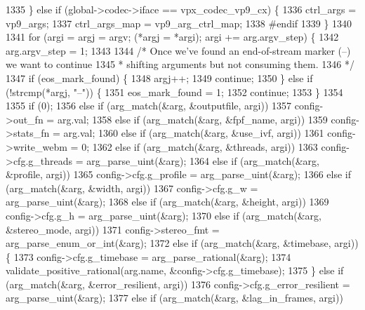 \begin{DoxyCodeInclude}
{{{{{{{{{{{{{{{{{{{{{{{{{{{{{{{{{{1335   \} \textcolor{keywordflow}{else} \textcolor{keywordflow}{if} (global->codec->iface == vpx\_codec\_vp9\_cx) \{
1336     ctrl\_args = vp9\_args;
1337     ctrl\_args\_map = vp9\_arg\_ctrl\_map;
1338 \textcolor{preprocessor}{#endif}
1339   \}
1340 
1341   \textcolor{keywordflow}{for} (argi = argj = argv; (*argj = *argi); argi += arg.argv\_step) \{
1342     arg.argv\_step = 1;
1343 
1344     \textcolor{comment}{/* Once we've found an end-of-stream marker (--) we want to continue}
1345 \textcolor{comment}{     * shifting arguments but not consuming them.}
1346 \textcolor{comment}{     */}
1347     \textcolor{keywordflow}{if} (eos\_mark\_found) \{
1348       argj++;
1349       \textcolor{keywordflow}{continue};
1350     \} \textcolor{keywordflow}{else} \textcolor{keywordflow}{if} (!strcmp(*argj, \textcolor{stringliteral}{"--"})) \{
1351       eos\_mark\_found = 1;
1352       \textcolor{keywordflow}{continue};
1353     \}
1354 
1355     \textcolor{keywordflow}{if} (0);
1356     \textcolor{keywordflow}{else} \textcolor{keywordflow}{if} (arg\_match(&arg, &outputfile, argi))
1357       config->out\_fn = arg.val;
1358     \textcolor{keywordflow}{else} if (arg\_match(&arg, &fpf\_name, argi))
1359       config->stats\_fn = arg.val;
1360     \textcolor{keywordflow}{else} if (arg\_match(&arg, &use\_ivf, argi))
1361       config->write\_webm = 0;
1362     \textcolor{keywordflow}{else} if (arg\_match(&arg, &threads, argi))
1363       config->cfg.g\_threads = arg\_parse\_uint(&arg);
1364     \textcolor{keywordflow}{else} \textcolor{keywordflow}{if} (arg\_match(&arg, &profile, argi))
1365       config->cfg.g\_profile = arg\_parse\_uint(&arg);
1366     \textcolor{keywordflow}{else} \textcolor{keywordflow}{if} (arg\_match(&arg, &width, argi))
1367       config->cfg.g\_w = arg\_parse\_uint(&arg);
1368     \textcolor{keywordflow}{else} \textcolor{keywordflow}{if} (arg\_match(&arg, &height, argi))
1369       config->cfg.g\_h = arg\_parse\_uint(&arg);
1370     \textcolor{keywordflow}{else} \textcolor{keywordflow}{if} (arg\_match(&arg, &stereo\_mode, argi))
1371       config->stereo\_fmt = arg\_parse\_enum\_or\_int(&arg);
1372     \textcolor{keywordflow}{else} \textcolor{keywordflow}{if} (arg\_match(&arg, &timebase, argi)) \{
1373       config->cfg.g\_timebase = arg\_parse\_rational(&arg);
1374       validate\_positive\_rational(arg.name, &config->cfg.g\_timebase);
1375     \} \textcolor{keywordflow}{else} \textcolor{keywordflow}{if} (arg\_match(&arg, &error\_resilient, argi))
1376       config->cfg.g\_error\_resilient = arg\_parse\_uint(&arg);
1377     \textcolor{keywordflow}{else} \textcolor{keywordflow}{if} (arg\_match(&arg, &lag\_in\_frames, argi))
}}}}}}}}}}}}}}}}}}}}}}}}}}}}}}}}}}
\end{DoxyCodeInclude}
